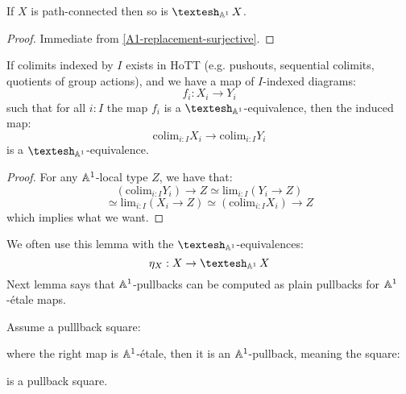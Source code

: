 \begin{lemma}
If $X$ is path-connected then so is $\shape_{\A^1}X$.
\end{lemma}

\begin{proof}
Immediate from \cref{A1-replacement-surjective}.
\end{proof}

\begin{lemma}\label{colimit-shape}
If colimits indexed by $I$ exists in HoTT (e.g. pushouts, sequential colimits, quotients of group actions), and we have a map of $I$-indexed diagrams:
\[f_i : X_i \to Y_i\]
such that for all $i:I$ the map $f_i$ is a $\shape_{\A^1}$-equivalence, then the induced map: 
\[\mathrm{colim}_{i:I} X_i \to \mathrm{colim}_{i:I} Y_i\]
is a $\shape_{\A^1}$-equivalence.
\end{lemma}

\begin{proof}
For any $\mathbb{A}^1$-local type $Z$, we have that:
\[(\mathrm{colim}_{i:I} Y_i) \to Z \simeq \mathrm{lim}_{i:I} (Y_i \to Z)\]
\[\simeq \mathrm{lim}_{i:I} (X_i \to Z) \simeq (\mathrm{colim}_{i:I} X_i) \to Z\]
which implies what we want.
\end{proof}

We often use this lemma with the $\shape_{\A^1}$-equivalences:
\[\eta_X : X \to \shape_{\A^1} X\]
Next lemma says that $\mathbb{A}^1$-pullbacks can be computed as plain pullbacks for $\mathbb{A}^1$-étale maps.

\begin{lemma}
Assume a pulllback square:
  \begin{center}
  \end{center}
  where the right map is $\mathbb{A}^1$-étale, then it is an $\mathbb{A}^1$-pullback, meaning the square:  
  \begin{center}
  \end{center}
  is a pullback square.
\end{lemma}

